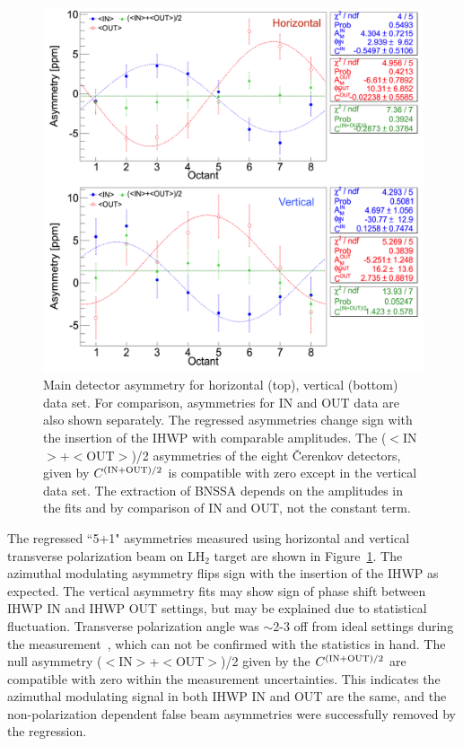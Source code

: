 \begin{figure}[!h]
	\begin{center}
	\includegraphics[width=15.0cm]{figures/asymmetry_In_Out_H2}
	\end{center}
	\caption
	{Main detector asymmetry for horizontal (top), vertical (bottom) data set. For comparison, asymmetries for IN and OUT data are also shown separately. The regressed asymmetries change sign with the insertion of the IHWP with comparable amplitudes. The ($<$IN$>$+$<$OUT$>$)/2 asymmetries of the eight \v{C}erenkov detectors, given by $C^{\rm (IN+OUT)/2}$ is compatible with zero except in the vertical data set. The extraction of BNSSA depends on the amplitudes in the fits and by comparison of IN and OUT, not the constant term.}
	\label{fig:asymmetry_In_Out_H2}
\end{figure}

The regressed ``5+1" asymmetries measured using horizontal and vertical transverse polarization beam on LH$_{2}$ target are shown in Figure~\ref{fig:asymmetry_In_Out_H2}. The azimuthal modulating asymmetry flips sign with the insertion of the IHWP as expected. The vertical asymmetry fits may show sign of phase shift between IHWP IN and IHWP OUT settings, but may be explained due to statistical fluctuation. Transverse polarization angle was $\sim$2-3\degrees{} off from ideal settings during the measurement~\cite{elogAcc:riad_1567146, hclog:page_219054}, which can not be confirmed with the statistics in hand. The null asymmetry ($<$IN$>$+$<$OUT$>$)/2 given by the $C^{\rm (IN+OUT)/2}$ are compatible with zero  within the measurement uncertainties. This indicates the azimuthal modulating signal in both IHWP IN and OUT are the same, and the non-polarization dependent false beam asymmetries were successfully removed by the regression.

